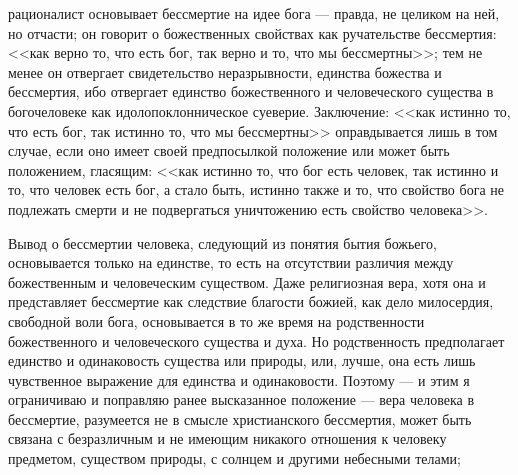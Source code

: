 \documentclass[12pt]{article}
\begin{document}
рационалист основывает бессмертие на идее бога --- правда, не целиком на ней, но отчасти; он говорит о божественных свойствах как ручательстве бессмертия: <<как верно то, что есть бог, так верно и то, что мы бессмертны>>; тем не менее он отвергает свидетельство неразрывности, единства божества и бессмертия, ибо отвергает единство божественного и человеческого существа в богочеловеке как идолопоклонническое суеверие. Заключение: <<как истинно то, что есть бог, так истинно то, что мы бессмертны>>  оправдывается лишь в том случае, если оно имеет своей предпосылкой положение или может быть положением, гласящим: <<как истинно то, что бог есть человек, так истинно и то, что человек есть бог, а стало быть, истинно также и то, что свойство бога не подлежать смерти и не подвергаться уничтожению есть свойство человека>>. 

Вывод о бессмертии человека, следующий из понятия бытия божьего, основывается только на единстве, то есть на отсутствии различия между божественным и человеческим существом. Даже религиозная вера, хотя она и представляет бессмертие как следствие благости божией, как дело милосердия, свободной воли бога, основывается в то же время на родственности божественного и человеческого существа и духа. Но родственность предполагает единство и одинаковость существа или природы, или, лучше, она есть лишь чувственное выражение для единства и одинаковости. Поэтому --- и этим я ограничиваю и поправляю ранее высказанное положение --- вера человека в бессмертие, разумеется не в смысле христианского бессмертия, может быть связана с безразличным и не имеющим никакого отношения к человеку предметом, существом природы, с солнцем и другими небесными телами; 
\end{document}
